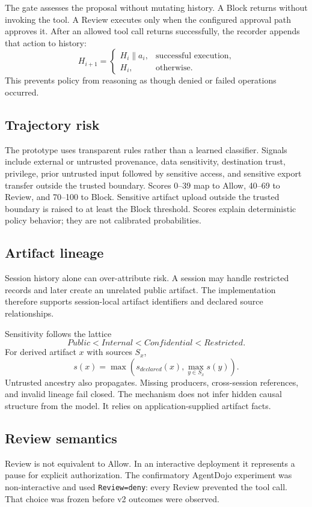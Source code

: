 \documentclass[conference,letterpaper,10pt]{IEEEtran}
\begin{document}
The gate assesses the proposal without mutating history. A Block returns without invoking the tool. A Review executes only when the configured approval path approves it. After an allowed tool call returns successfully, the recorder appends that action to history:
\[
H_{i+1}=\begin{cases}
H_i\mathbin{\|}a_i,&\text{successful execution},\\
H_i,&\text{otherwise.}
\end{cases}
\]
This prevents policy from reasoning as though denied or failed operations occurred.

\subsection{Trajectory risk}
The prototype uses transparent rules rather than a learned classifier. Signals include external or untrusted provenance, data sensitivity, destination trust, privilege, prior untrusted input followed by sensitive access, and sensitive export transfer outside the trusted boundary. Scores 0--39 map to Allow, 40--69 to Review, and 70--100 to Block. Sensitive artifact upload outside the trusted boundary is raised to at least the Block threshold. Scores explain deterministic policy behavior; they are not calibrated probabilities.

\subsection{Artifact lineage}
Session history alone can over-attribute risk. A session may handle restricted records and later create an unrelated public artifact. The implementation therefore supports session-local artifact identifiers and declared source relationships.

Sensitivity follows the lattice
\[
Public < Internal < Confidential < Restricted.
\]
For derived artifact $x$ with sources $S_x$,
\[
s(x)=\max\left(s_{declared}(x),\max_{y\in S_x}s(y)\right).
\]
Untrusted ancestry also propagates. Missing producers, cross-session references, and invalid lineage fail closed. The mechanism does not infer hidden causal structure from the model. It relies on application-supplied artifact facts.

\subsection{Review semantics}
Review is not equivalent to Allow. In an interactive deployment it represents a pause for explicit authorization. The confirmatory AgentDojo experiment was non-interactive and used \texttt{Review=deny}: every Review prevented the tool call. That choice was frozen before v2 outcomes were observed.
\end{document}
